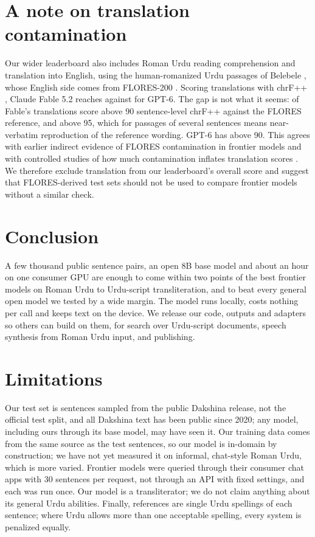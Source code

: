 \documentclass[11pt]{article}
\begin{document}
\section{A note on translation contamination}\label{sec:contamination}

Our wider leaderboard also includes Roman Urdu reading comprehension and translation into English, using the human-romanized Urdu passages of Belebele \citep{bandarkar2024belebele}, whose English side comes from FLORES-200 \citep{nllb2022}. Scoring translations with chrF++ \citep{popovic2017chrf,post2018sacrebleu}, Claude Fable 5.2 reaches \ContFableChrf against \ContGptChrf for GPT-6. The gap is not what it seems: \ContFableNinety of Fable's \ContNTr translations score above 90 sentence-level chrF++ against the FLORES reference, and \ContFableNinetyFive above 95, which for passages of several sentences means near-verbatim reproduction of the reference wording. GPT-6 has \ContGptNinety above 90. This agrees with earlier indirect evidence of FLORES contamination in frontier models \citep{enis2024llm} and with controlled studies of how much contamination inflates translation scores \citep{kocyigit2025overestimation,tan2026flores}. We therefore exclude translation from our leaderboard's overall score and suggest that FLORES-derived test sets should not be used to compare frontier models without a similar check.

\section{Conclusion}

A few thousand public sentence pairs, an open 8B base model and about an hour on one consumer GPU are enough to come within two points of the best frontier models on Roman Urdu to Urdu-script transliteration, and to beat every general open model we tested by a wide margin. The model runs locally, costs nothing per call and keeps text on the device. We release our code, outputs and adapters so others can build on them, for search over Urdu-script documents, speech synthesis from Roman Urdu input, and publishing.

\section*{Limitations}

Our test set is \NTest sentences sampled from the public Dakshina release, not the official test split, and all Dakshina text has been public since 2020; any model, including ours through its base model, may have seen it. Our training data comes from the same source as the test sentences, so our model is in-domain by construction; we have not yet measured it on informal, chat-style Roman Urdu, which is more varied. Frontier models were queried through their consumer chat apps with 30 sentences per request, not through an API with fixed settings, and each was run once. Our model is a transliterator; we do not claim anything about its general Urdu abilities. Finally, references are single Urdu spellings of each sentence; where Urdu allows more than one acceptable spelling, every system is penalized equally.


\end{document}

